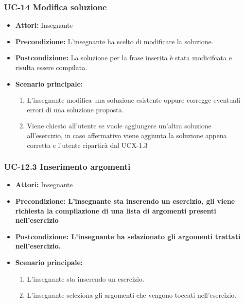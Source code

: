\subsubsection{UC-14 Modifica soluzione}
\begin{itemize}
\item \textbf{Attori: }Insegnante

\item \textbf{Precondizione: }L'insegnante ha scelto di modificare la soluzione.
\item \textbf{Postcondizione: }La soluzione per la frase inserita è stata modicifcata e risulta essere compilata.
\item \textbf{Scenario principale: }
		\begin{enumerate}
		\item L'insegnante modifica una soluzione esistente oppure corregge eventuali errori di una soluzione proposta. 
		\item Viene chiesto all'utente se vuole aggiungere un'altra soluzione all'esercizio, in 
		caso affermativo viene aggiunta la soluzione appena corretta e l'utente ripartirà dal UCX-1.3
		\end{enumerate}
\end{itemize}

\subsubsection{UC-12.3 Inserimento argomenti}
\begin{itemize}
\item \textbf{Attori: }Insegnante

\item \textbf{Precondizione: L'insegnante sta inserendo un esercizio, gli viene richiesta la compilazione di una lista di argomenti presenti nell'esercizio}
\item \textbf{Postcondizione: L'insegnante ha selazionato gli argomenti trattati nell'esercizio.}
\item \textbf{Scenario principale: }
		\begin{enumerate}
		\item L'insegnante sta inserendo un esercizio. 
		\item L'insegnante seleziona gli argomenti che vengono toccati nell'esercizio. 
		\end{enumerate}
\end{itemize}
